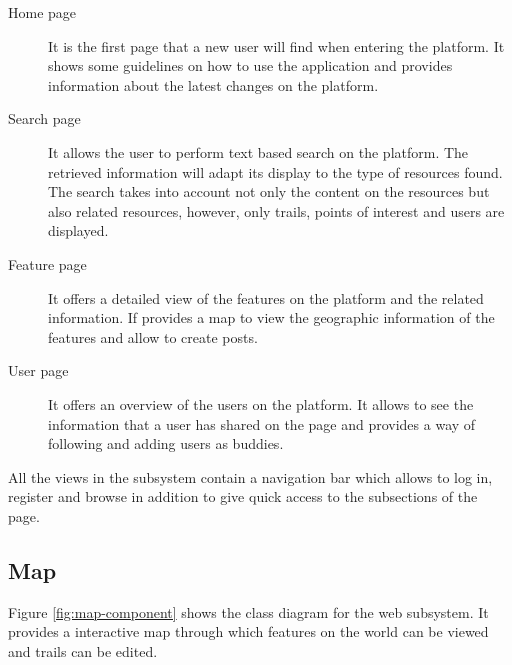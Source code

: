 \begin{description}
\item[Home page] It is the first page that a new user will find when entering the platform. It shows some guidelines on how to use the application and provides information about the latest changes on the platform.

\item[Search page] It allows the user to perform text based search on the platform. The retrieved information will adapt its display to the type of resources found. The search takes into account not only the content on the resources but also related resources, however, only trails, points of interest and users are displayed.

\item[Feature page] It offers a detailed view of the features on the platform and the related information. If provides a map to view the geographic information of the features and allow to create posts.

\item[User page] It offers an overview of the users on the platform. It allows to see the information that a user has shared on the page and provides a way of following and adding users as buddies.
\end{description}

All the views in the subsystem contain a navigation bar which allows to log in, register and browse in addition to give quick access to the subsections of the page.

\subsection{Map}

Figure \ref{fig:map-component} shows the class diagram for the web subsystem. It provides a interactive map through which features on the world can be viewed and trails can be edited.

